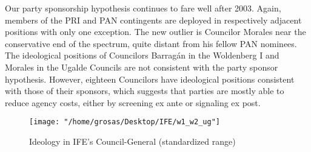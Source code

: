 \documentclass[12 pt, letter]{article}
\newcommand{\condcomment}[2]{\ifthenelse{#1}{#2}{}}
\begin{document}
Our party sponsorship hypothesis continues to fare well after 2003. Again, members of the PRI and PAN contingents are deployed in respectively adjacent positions with only one exception.  The new outlier is Councilor Morales near the conservative end of the spectrum, quite distant from his fellow PAN nominees. The ideological positions of Councilors Barrag\'an in the Woldenberg I and Morales in the Ugalde Councils are not consistent with the party sponsor hypothesis.  However, eighteen Councilors have ideological positions consistent with those of their sponsors, which suggests that parties are mostly able to reduce agency costs, either by screening ex ante or signaling ex post.

\begin{figure}
\begin{center}
\texttt{[image: "/home/grosas/Desktop/IFE/w1\_w2\_ug"]}
\caption{Ideology in IFE's Council-General (standardized
range)}\label{F:ideolbars}
\end{center}
\end{figure}
\end{document}
